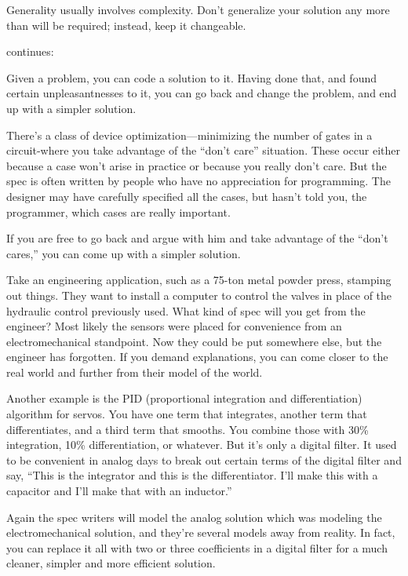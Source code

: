 \begin{tip}
Generality usually involves complexity. Don't generalize your solution any
more than will be required; instead, keep it changeable.
\end{tip}

\begin{interview}
 continues:
\begin{tfquot}

Given a problem, you can code a solution to it. Having done that, and found
certain unpleasantnesses to it, you can go back and change the problem,
and end up with a simpler solution.

There's a class of device optimization---minimizing the number of gates in a
circuit-where you take advantage of the ``don't care'' situation. These
occur either because a case won't arise in practice or because you really
don't care. But the spec is often written by people who have no appreciation
for programming. The designer may have carefully specified all the cases,
but hasn't told you, the programmer, which cases are really important.

If you are free to go back and argue with him and take advantage of the
``don't cares,'' you can come up with a simpler solution.

Take an engineering application, such as a 75-ton metal powder press,
stamping out things. They want to install a computer to control the
valves in place of the hydraulic control previously used. What kind of
spec will you get from the engineer? Most likely the sensors were
placed for convenience from an electromechanical standpoint. Now they
could be put somewhere else, but the engineer has forgotten. If you
demand explanations, you can come closer to the real world and further
from their model of the world.

Another example is the PID (proportional integration and
differentiation) algorithm for servos. You have one term that
integrates, another term that differentiates, and a third term that
smooths. You combine those with 30\% integration, 10\%
differentiation, or whatever. But it's only a digital filter. It used
to be convenient in analog days to break out certain terms of the
digital filter and say, ``This is the integrator and this is the
differentiator. I'll make this with a capacitor and I'll make that
with an inductor.''

Again the spec writers will model the analog solution which was
modeling the electromechanical solution, and they're several models
away from reality. In fact, you can replace it all with two or three
coefficients in a digital filter for a much cleaner, simpler and more
efficient solution.
\end{tfquot}
\end{interview}

